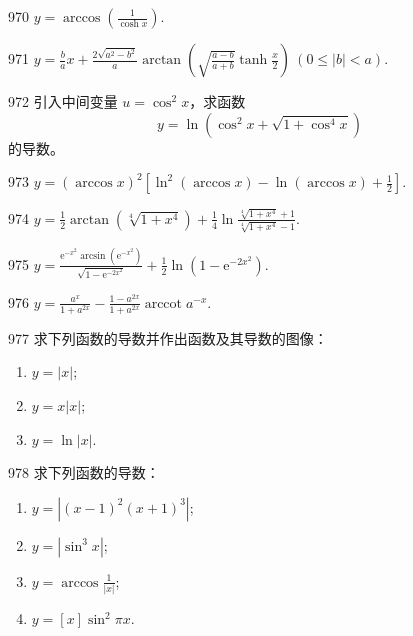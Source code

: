 \begin{prob}[S]{970}
$y = \arccos\left(\frac{1}{\cosh x}\right)$.
\end{prob}

\begin{prob}[S]{971}
$y = \frac{b}{a} x + \frac{2\sqrt{a^2 - b^2}}{a} \arctan \left( \sqrt{\frac{a - b}{a + b}} \tanh \frac{x}{2} \right) \ (0 \leqslant |b| < a)$.
\end{prob}

\begin{prob}[M]{972}
引入中间变量 $u = \cos^2 x$，求函数
\[
y = \ln(\cos^2 x + \sqrt{1 + \cos^4 x})
\]
的导数。
\end{prob}


\begin{prob}[S]{973}
$y = (\arccos x)^2 \left[ \ln^2(\arccos x) - \ln(\arccos x) + \frac{1}{2} \right]$.
\end{prob}

\begin{prob}[S]{974}
$y = \frac{1}{2} \arctan(\sqrt[4]{1 + x^4}) + \frac{1}{4} \ln \frac{\sqrt[4]{1 + x^4} + 1}{\sqrt[4]{1 + x^4} - 1}$.
\end{prob}

\begin{prob}[S]{975}
$y = \frac{\mathrm{e}^{-x^2} \arcsin(\mathrm{e}^{-x^2})}{\sqrt{1 - \mathrm{e}^{-2x^2}}} + \frac{1}{2} \ln(1 - \mathrm{e}^{-2x^2})$.
\end{prob}

\begin{prob}[S]{976}
$y = \frac{a^x}{1 + a^{2x}} - \frac{1 - a^{2x}}{1 + a^{2x}} \operatorname{arccot} a^{-x}$.
\end{prob}

\begin{prob}[L]{977}
求下列函数的导数并作出函数及其导数的图像：
\begin{enumerate}[label=(\alph*), itemsep=2pt, topsep=3pt]
\item $y = |x|$;
\item $y = x|x|$;
\item $y = \ln |x|$.
\end{enumerate}
\end{prob}

\begin{prob}[L]{978}
求下列函数的导数：
\begin{enumerate}[label=(\alph*), itemsep=2pt, topsep=3pt]
\item $y = |(x - 1)^2 (x + 1)^3|$;
\item $y = |\sin^3 x|$;
\item $y = \arccos \frac{1}{|x|}$;
\item $y = [x] \sin^2 \pi x$.
\end{enumerate}
\end{prob}

